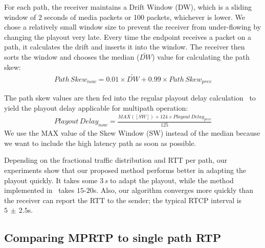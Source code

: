 For each path, the receiver maintains a Drift Window (DW), which is a sliding
window of 2 seconds of media packets or 100 packets, whichever is lower. We
chose a relatively small window size to prevent the receiver from under-flowing
by changing the playout very late. Every time the endpoint receives a packet
on a path, it calculates the drift and inserts it into the window. The
receiver then sorts the window and chooses the median ($\widetilde{DW}$) value
for calculating the path skew: 
\begin{align*}
Path\,Skew_{now} = 0.01 \times \widetilde{DW} + 0.99\times Path\,Skew_{prev}
\end{align*}

The path skew values are then fed into the regular playout delay
calculation~\cite{Fober05,Colin03} to yield the playout delay  applicable for
multipath operation:
\begin{align*}
Playout\,Delay_{now} = \frac{MAX([SW]) + 124 \times Playout\,Delay_{prev}}{125}
\end{align*}
We use the MAX value of the Skew Window (SW) instead of the median because we
want to include the high latency path as soon as possible.

Depending on the fractional traffic distribution and RTT per path, our
experiments show that our proposed method performs better in adapting the
playout quickly. It takes some 3\,\emph{s} to adapt the playout, while the method
implemented in~\cite{871096,Fober05,Colin03} takes $15$-$20$s. Also, our algorithm
converges more quickly than the receiver can report the RTT to the sender; the
typical RTCP interval is $5\,\pm\,2.5$s.

\subsection{Comparing MPRTP to single path RTP}

